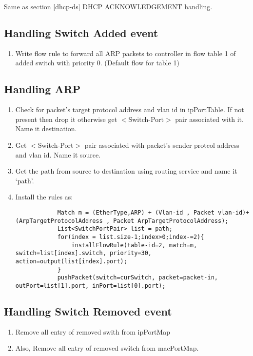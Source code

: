 \documentclass{article}
\begin{document}
Same as section \ref{dhcp-ds} DHCP ACKNOWLEDGEMENT handling.

\subsection{Handling Switch Added event}

\begin{enumerate}
	\item Write flow rule to forward all ARP packets to controller in flow table 1 of added switch with priority 0. (Default flow for table 1) 
\end{enumerate}

\subsection{Handling ARP}

\begin{enumerate}
	\item Check for packet's target protocol address and vlan id in ipPortTable. If not present then drop it otherwise get $<$Switch-Port$>$ pair associated with it. Name it destination.
	\item Get $<$Switch-Port$>$ pair associated with packet's sender protcol address and vlan id. Name it source.
	\item Get the path from source to destination using routing service and name it `path'.
	\item Install the rules as:
		\begin{lstlisting}
			Match m = (EtherType,ARP) + (Vlan-id , Packet vlan-id)+(ArpTargetProtocolAddress , Packet ArpTargetProtocolAddress);
			List<SwitchPortPair> list = path;
			for(index = list.size-1;index>0;index-=2){
				installFlowRule(table-id=2, match=m, switch=list[index].switch, priority=30, action=output(list[index].port);
			}
			pushPacket(switch=curSwitch, packet=packet-in, outPort=list[1].port, inPort=list[0].port);
		\end{lstlisting}
\end{enumerate}


\subsection{Handling Switch Removed event}

\begin{enumerate}
	\item Remove all entry of removed swith from ipPortMap
	\item Also, Remove all entry of removed switch from macPortMap.
\end{enumerate}

\printbibliography
\end{document}
